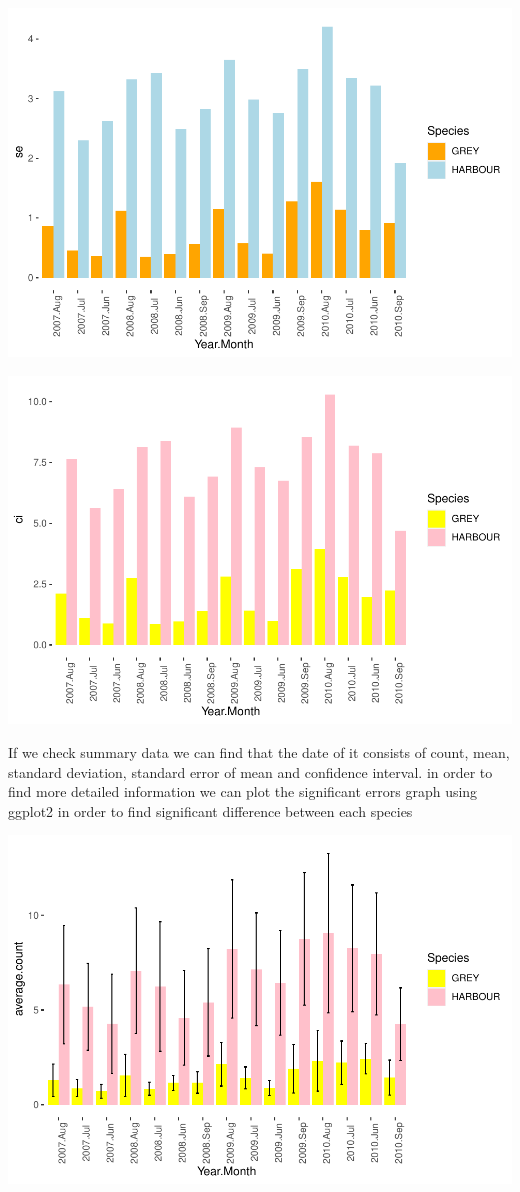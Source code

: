 \documentclass[
]{article}
\begin{document}
\includegraphics{Statistical-analysis-in-RStudio_files/figure-latex/unnamed-chunk-34-1.pdf}

\includegraphics{Statistical-analysis-in-RStudio_files/figure-latex/unnamed-chunk-35-1.pdf}

If we check summary data we can find that the date of it consists of
count, mean, standard deviation, standard error of mean and confidence
interval. in order to find more detailed information we can plot the
significant errors graph using ggplot2 in order to find significant
difference between each species

\includegraphics{Statistical-analysis-in-RStudio_files/figure-latex/unnamed-chunk-36-1.pdf}
\end{document}
